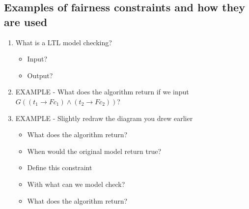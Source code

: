 \documentclass[fleqn]{article}
\begin{document}
\subsection{Examples of fairness constraints and how they are used}
\begin{enumerate}
    \item What is a LTL model checking?
    \begin{itemize}
        \item Input?
        \item Output?
    \end{itemize}
    \item EXAMPLE - What does the algorithm return if we input $G ((t_1 \rightarrow Fc_1) \wedge (t_2 \rightarrow Fc_2))$?
    \item EXAMPLE - Slightly redraw the diagram you drew earlier
    \begin{itemize}
        \item What does the algorithm return?
        \item When would the original model return true?
        \item Define this constraint
        \item With what can we model check?
        \item What does the algorithm return?
    \end{itemize}
\end{enumerate}
\end{document}
